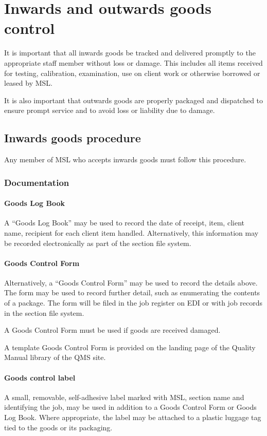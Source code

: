 \section{Inwards and outwards goods control}
\label{s:inwards_outwards_goods}
It is important that all inwards goods be tracked and delivered promptly to the appropriate staff member without loss or damage. This includes all items received for testing, calibration, examination, use on client work or otherwise borrowed or leased by MSL.

It is also important that outwards goods are properly packaged and dispatched to ensure prompt service and to avoid loss or liability due to damage.

\subsection{Inwards goods procedure}
Any member of MSL who accepts inwards goods must follow this procedure.

\subsubsection{Documentation}
\paragraph{Goods Log Book}
A ``Goods Log Book'' may be used to record the date of receipt, item, client name, recipient for each client item handled. Alternatively, this information may be recorded electronically as part of the section file system.

\paragraph{Goods Control Form}
Alternatively, a ``Goods Control Form'' may be used to record the details above.  The form may be used to record further detail, such as enumerating the contents of a package. The form will be filed in the job register on EDI or with job records in the section file system. 

A Goods Control Form must be used if goods are received damaged.

A template Goods Control Form is provided on the landing page of the Quality Manual library of the QMS site.

\paragraph{Goods control label}
A small, removable, self-adhesive label marked with MSL, section name and identifying the job, may be used in addition to a Goods Control Form or Goods Log Book. Where appropriate, the label may be attached to a plastic luggage tag tied to the goods or its packaging.

